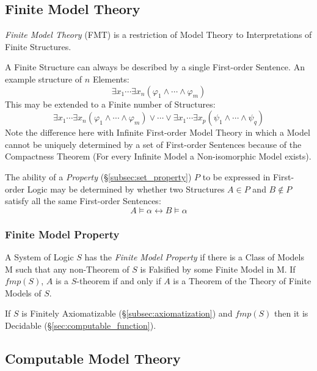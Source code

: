 \subsection{Finite Model Theory}

\emph{Finite Model Theory} (FMT) is a restriction of Model Theory to
Interpretations of Finite Structures.

A Finite Structure can always be described by a single First-order
Sentence. An example structure of $n$ Elements:
\[
    \exists x_1 \cdots \exists x_n ( \varphi_1 \wedge \cdots \wedge
    \varphi_m )
\]
This may be extended to a Finite number of Structures:
\[
    \exists x_1 \cdots \exists x_n ( \varphi_1 \wedge \cdots \wedge
    \varphi_m )
    \vee
    \cdots
    \vee
    \exists x_1 \cdots \exists x_p ( \psi_1 \wedge \cdots \wedge
    \psi_q )
\]
Note the difference here with Infinite First-order Model Theory in
which a Model cannot be uniquely determined by a set of First-order
Sentences because of the Compactness Theorem (For every Infinite Model
a Non-isomorphic Model exists).

The ability of a \emph{Property} (\S\ref{subsec:set_property}) $P$ to
be expressed in First-order Logic may be determined by whether two
Structures $A \in P$ and $B \notin P$ satisfy all the same First-order
Sentences:
\[
    A \vDash \alpha \leftrightarrow B \vDash \alpha
\]

\subsubsection{Finite Model Property}

A System of Logic $S$ has the \emph{Finite Model Property} if there is
a Class of Models $\mathrm{M}$ such that any non-Theorem of $S$ is
Falsified by some Finite Model in $\mathrm{M}$. If $fmp(S)$, $A$ is a
$S$-theorem if and only if $A$ is a Theorem of the Theory of Finite
Models of $S$.

If $S$ is Finitely Axiomatizable (\S\ref{subsec:axiomatization}) and
$fmp(S)$ then it is Decidable (\S\ref{sec:computable_function}).



\subsection{Computable Model Theory}\label{subsec:computable_model_theory}

